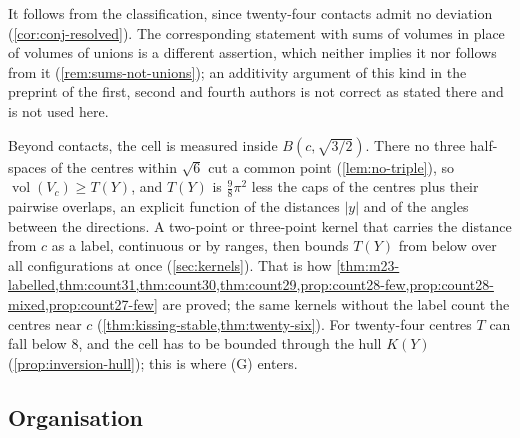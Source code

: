 \documentclass[11pt,reqno]{amsart}
\renewcommand{\_}{\origunderscore\allowbreak}
\numberwithin{equation}{section}
\theoremstyle{plain}
\theoremstyle{definition}
\theoremstyle{remark}
\DeclareMathOperator{\vol}{vol}
\begin{document}
It follows from the classification, since twenty-four contacts admit no
deviation (\cref{cor:conj-resolved}). The corresponding statement with sums
of volumes in place of volumes of unions is a different assertion, which
neither implies it nor follows from it (\cref{rem:sums-not-unions}); an
additivity argument of this kind in the preprint \cite{BBB26} of the first,
second and fourth authors is not correct as stated there and is not used
here.

Beyond contacts, the cell is measured inside $B(c,\sqrt{3/2})$. There no
three half-spaces of the centres within $\sqrt6$ cut a common point
(\cref{lem:no-triple}), so $\vol(V_c)\ge T(Y)$, and $T(Y)$ is
$\frac98\pi^2$ less the caps of the centres plus their pairwise
overlaps, an explicit function of the distances $|y|$ and of the angles
between the directions. A two-point or three-point kernel that carries the
distance from $c$ as a label, continuous or by ranges, then bounds $T(Y)$
from below over all configurations at once (\cref{sec:kernels}). That is how
\cref{thm:m23-labelled,thm:count31,thm:count30,thm:count29,prop:count28-few,prop:count28-mixed,prop:count27-few} are proved; the same
kernels without the label count the centres near $c$
(\cref{thm:kissing-stable,thm:twenty-six}). For twenty-four centres $T$ can fall below $8$, and the cell has to
be bounded through the hull $K(Y)$ (\cref{prop:inversion-hull}); this is
where (G) enters.

\subsection{Organisation}\label{sec:argument-structure}
\end{document}
